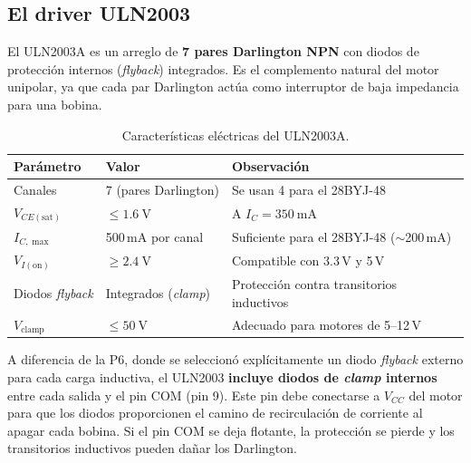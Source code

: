 \documentclass[11pt]{article}
\begin{document}
\subsection{El driver ULN2003}
El ULN2003A es un arreglo de \textbf{7 pares Darlington NPN} con diodos de protección
internos (\emph{flyback}) integrados. Es el complemento natural del motor unipolar, ya
que cada par Darlington actúa como interruptor de baja impedancia para una bobina.
\begin{table}[H]\centering
\caption{Características eléctricas del ULN2003A.}
\begin{tabular}{lll}
\toprule
Parámetro & Valor & Observación \\
\midrule
Canales & 7 (pares Darlington) & Se usan 4 para el 28BYJ-48 \\
$V_{CE(\text{sat})}$ & $\le\SI{1.6}{\volt}$ & A $I_C=\SI{350}{\milli\ampere}$ \\
$I_{C,\max}$ & 500\,mA por canal & Suficiente para el 28BYJ-48 ($\sim$200\,mA) \\
$V_{I(\text{on})}$ & $\ge\SI{2.4}{\volt}$ & Compatible con 3.3\,V y 5\,V \\
Diodos \emph{flyback} & Integrados (\emph{clamp}) & Protección contra transitorios inductivos \\
$V_\text{clamp}$ & $\le\SI{50}{\volt}$ & Adecuado para motores de 5--12\,V \\
\bottomrule
\end{tabular}
\end{table}

\begin{nota}
A diferencia de la P6, donde se seleccionó explícitamente un diodo \emph{flyback}
externo para cada carga inductiva, el ULN2003 \textbf{incluye diodos de \emph{clamp}
internos} entre cada salida y el pin COM (pin 9). Este pin debe conectarse a $V_{CC}$
del motor para que los diodos proporcionen el camino de recirculación de corriente al
apagar cada bobina. Si el pin COM se deja flotante, la protección se pierde y los
transitorios inductivos pueden dañar los Darlington.
\end{nota}
\end{document}
